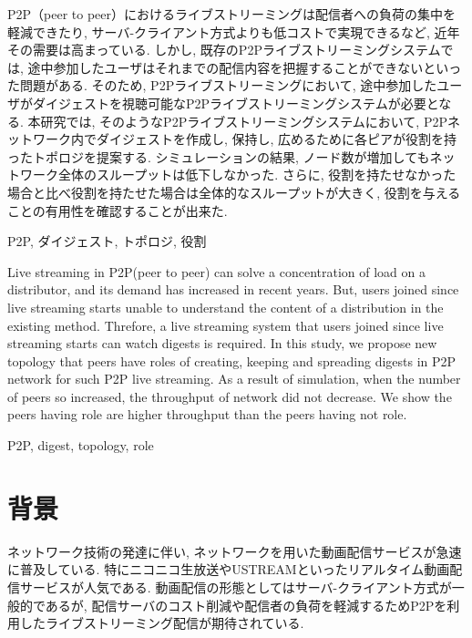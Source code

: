 \documentclass[letter]{ieicej}
\begin{document}
\begin{jabstract}
P2P（peer to peer）におけるライブストリーミングは配信者への負荷の集中を軽減できたり, サーバ-クライアント方式よりも低コストで実現できるなど, 近年その需要は高まっている. しかし, 既存のP2Pライブストリーミングシステムでは, 途中参加したユーザはそれまでの配信内容を把握することができないといった問題がある. そのため, P2Pライブストリーミングにおいて, 途中参加したユーザがダイジェストを視聴可能なP2Pライブストリーミングシステムが必要となる. 本研究では, そのようなP2Pライブストリーミングシステムにおいて, P2Pネットワーク内でダイジェストを作成し, 保持し, 広めるために各ピアが役割を持ったトポロジを提案する. シミュレーションの結果, ノード数が増加してもネットワーク全体のスループットは低下しなかった. さらに, 役割を持たせなかった場合と比べ役割を持たせた場合は全体的なスループットが大きく, 役割を与えることの有用性を確認することが出来た.
\end{jabstract}
\begin{jkeyword}
P2P, ダイジェスト, トポロジ, 役割
\end{jkeyword}
\begin{eabstract}
Live streaming in P2P(peer to peer) can solve a concentration of load on a distributor, and its demand has increased in recent years. But, users joined since live streaming starts unable to understand the content of a distribution in the existing method. Threfore, a live streaming system that users joined since live streaming starts can watch digests is required. In this study, we propose new topology that peers have roles of creating, keeping and spreading digests in P2P network for such  P2P live streaming. As a result of simulation, when the number of peers so increased, the throughput of network did not decrease. We show the peers having role are higher throughput than the peers having not role.

\end{eabstract}
\begin{ekeyword}
P2P, digest, topology, role
\end{ekeyword}
\maketitle

\section{背景}
ネットワーク技術の発達に伴い, ネットワークを用いた動画配信サービスが急速に普及している. 特にニコニコ生放送\cite{nico}やUSTREAM\cite{ust}といったリアルタイム動画配信サービスが人気である. 動画配信の形態としてはサーバ-クライアント方式が一般的であるが, 配信サーバのコスト削減や配信者の負荷を軽減するためP2Pを利用したライブストリーミング配信が期待されている.
\end{document}
